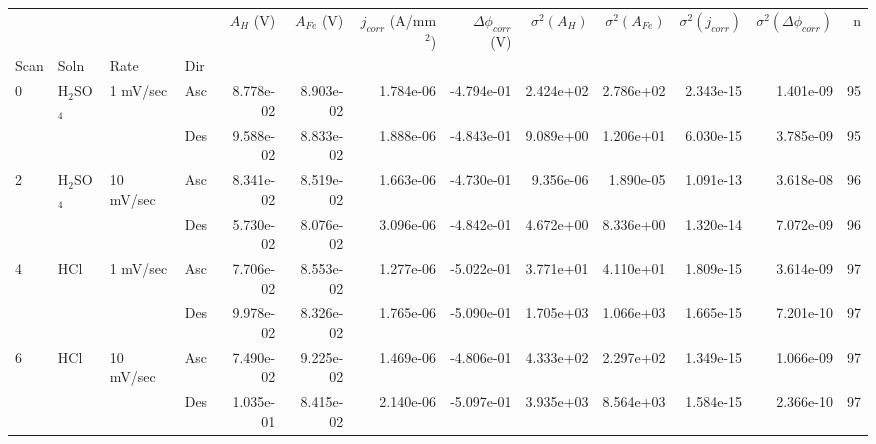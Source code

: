 \begin{tabular}{llllrrrrrrrrr}
\toprule
  &     &           &     &  $A_H$ (V) &  $A_{Fe}$ (V) &  $j_{corr}$ (A/mm$^2$) &  $\Delta \phi_{corr}$ (V) &  $\sigma^2(A_H)$ &  $\sigma^2(A_{Fe})$ &  $\sigma^2(j_{corr})$ &  $\sigma^2(\Delta \phi_{corr})$ &   n \\
Scan & Soln & Rate & Dir &            &               &                        &                           &                  &                     &                       &                                 &     \\
\midrule
0 & H$_2$SO$_4$ & 1 mV/sec & Asc &  8.778e-02 &     8.903e-02 &              1.784e-06 &                -4.794e-01 &        2.424e+02 &           2.786e+02 &             2.343e-15 &                       1.401e-09 &  95 \\
  &     &           & Des &  9.588e-02 &     8.833e-02 &              1.888e-06 &                -4.843e-01 &        9.089e+00 &           1.206e+01 &             6.030e-15 &                       3.785e-09 &  95 \\
2 & H$_2$SO$_4$ & 10 mV/sec & Asc &  8.341e-02 &     8.519e-02 &              1.663e-06 &                -4.730e-01 &        9.356e-06 &           1.890e-05 &             1.091e-13 &                       3.618e-08 &  96 \\
  &     &           & Des &  5.730e-02 &     8.076e-02 &              3.096e-06 &                -4.842e-01 &        4.672e+00 &           8.336e+00 &             1.320e-14 &                       7.072e-09 &  96 \\
4 & HCl & 1 mV/sec & Asc &  7.706e-02 &     8.553e-02 &              1.277e-06 &                -5.022e-01 &        3.771e+01 &           4.110e+01 &             1.809e-15 &                       3.614e-09 &  97 \\
  &     &           & Des &  9.978e-02 &     8.326e-02 &              1.765e-06 &                -5.090e-01 &        1.705e+03 &           1.066e+03 &             1.665e-15 &                       7.201e-10 &  97 \\
6 & HCl & 10 mV/sec & Asc &  7.490e-02 &     9.225e-02 &              1.469e-06 &                -4.806e-01 &        4.333e+02 &           2.297e+02 &             1.349e-15 &                       1.066e-09 &  97 \\
  &     &           & Des &  1.035e-01 &     8.415e-02 &              2.140e-06 &                -5.097e-01 &        3.935e+03 &           8.564e+03 &             1.584e-15 &                       2.366e-10 &  97 \\
\bottomrule
\end{tabular}
